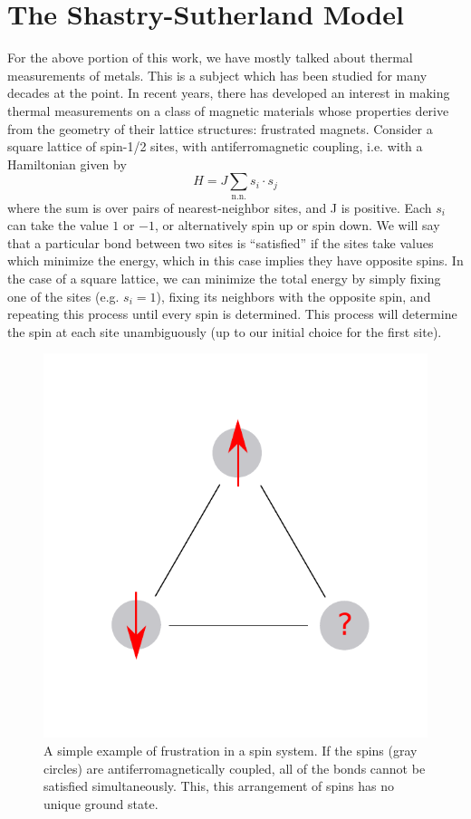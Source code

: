 \documentclass{thesis-umich}
\begin{document}
\section{The Shastry-Sutherland Model}
For the above portion of this work, we have mostly talked about thermal measurements of metals. This is a subject which has been studied for many decades at the point. In recent years, there has developed an interest in making thermal measurements on a class of magnetic materials whose properties derive from the geometry of their lattice structures: frustrated magnets. Consider a square lattice of spin-1/2 sites, with antiferromagnetic coupling, i.e. with a Hamiltonian given by
\[ H = J \sum_{\mathrm{n.n.}} s_i \cdot s_j\]
where the sum is over pairs of nearest-neighbor sites, and J is positive. Each $s_i$ can take the value $1$ or $-1$, or alternatively spin up or spin down. We will say that a particular bond between two sites is ``satisfied'' if the sites take values which minimize the energy, which in this case implies they have opposite spins. In the case of a square lattice, we can minimize the total energy by simply fixing one of the sites (e.g. $s_i = 1$), fixing its neighbors with the opposite spin, and repeating this process until every spin is determined. This process will determine the spin at each site unambiguously (up to our initial choice for the first site).
\begin{figure}
	\centering
	\caption[Frustration]{A simple example of frustration in a spin system. If the spins (gray circles) are antiferromagnetically coupled, all of the bonds cannot be satisfied simultaneously. This, this arrangement of spins has no unique ground state.}
	\label{fig:frustration}
	\includegraphics[width=0.6\columnwidth]{figures/frustration.pdf}
\end{figure}
\end{document}

